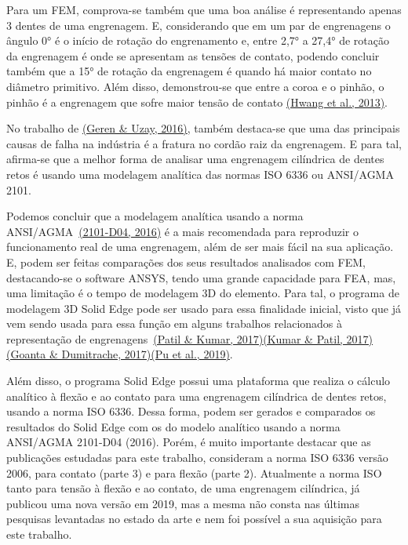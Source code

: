 \documentclass[12pt,a4paper]{article}
\begin{document}
Para um FEM, comprova-se também que uma boa análise é representando
apenas 3 dentes de uma engrenagem. E, considerando que em um par de
engrenagens o ângulo 0° é o início de rotação do engrenamento e, entre
2,7° a 27,4° de rotação da engrenagem é onde se apresentam as tensões de
contato, podendo concluir também que a 15° de rotação da engrenagem é
quando há maior contato no diâmetro primitivo. Além disso, demonstrou-se
que entre a coroa e o pinhão, o pinhão é a engrenagem que sofre maior
tensão de contato \hyperref[csl:14]{(Hwang et al., 2013)}.

No trabalho de \hyperref[csl:15]{(Geren \& Uzay, 2016)}, também destaca-se que uma das
principais causas de falha na indústria é a fratura no cordão raiz da
engrenagem. E para tal, afirma-se que a melhor forma de analisar uma
engrenagem cilíndrica de dentes retos é usando uma modelagem analítica
das normas ISO 6336 ou ANSI/AGMA 2101.

Podemos concluir que a modelagem analítica usando a norma
ANSI/AGMA~\hyperref[csl:5]{(2101-D04, 2016)} é a mais recomendada para reproduzir o
funcionamento real de uma engrenagem, além de ser mais fácil na sua
aplicação. E, podem ser feitas comparações dos seus resultados
analisados com FEM, destacando-se o software ANSYS, tendo uma grande
capacidade para FEA, mas, uma limitação é o tempo de modelagem 3D do
elemento. Para tal, o programa de modelagem 3D Solid Edge pode ser usado
para essa finalidade inicial, visto que já vem sendo usada para essa
função em alguns trabalhos relacionados à representação de
engrenagens~\hyperref[csl:16]{(Patil \& Kumar, 2017)}\hyperref[csl:17]{(Kumar \& Patil, 2017)}\hyperref[csl:18]{(Goanta \& Dumitrache, 2017)}\hyperref[csl:19]{(Pu et al., 2019)}.

Além disso, o programa Solid Edge possui uma plataforma que realiza o
cálculo analítico à flexão e ao contato para uma engrenagem cilíndrica
de dentes retos, usando a norma ISO 6336. Dessa forma, podem ser gerados
e comparados os resultados do Solid Edge com os do modelo analítico
usando a norma ANSI/AGMA 2101-D04 (2016). Porém, é muito importante
destacar que as publicações estudadas para este trabalho, consideram a
norma ISO 6336 versão 2006, para contato (parte 3) e para flexão (parte
2). Atualmente a norma ISO tanto para tensão à flexão e ao contato, de
uma engrenagem cilíndrica, já publicou uma nova versão em 2019, mas a
mesma não consta nas últimas pesquisas levantadas no estado da arte e
nem foi possível a sua aquisição para este trabalho.
\end{document}

